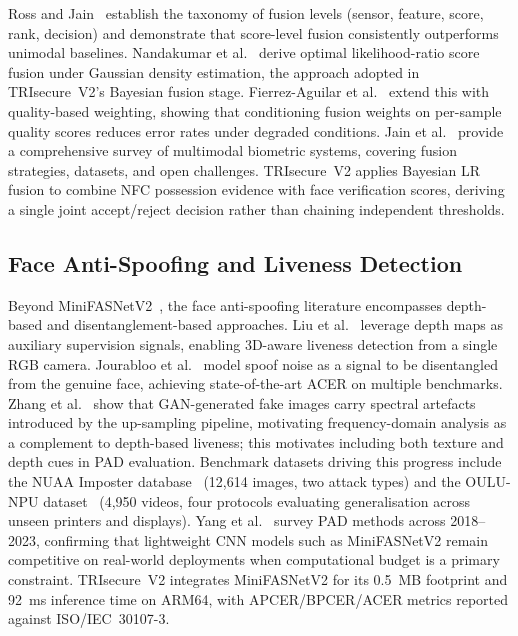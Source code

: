 \documentclass[preprint,12pt]{elsarticle}
\begin{document}
Ross and Jain~\cite{ross2003multimodal} establish the taxonomy of fusion
levels (sensor, feature, score, rank, decision) and demonstrate that
score-level fusion consistently outperforms unimodal baselines.
Nandakumar et al.~\cite{nandakumar2008fusion} derive optimal likelihood-ratio
score fusion under Gaussian density estimation, the approach adopted in
TRIsecure~V2's Bayesian fusion stage.
Fierrez-Aguilar et al.~\cite{fierrez2005fusion} extend this with quality-based
weighting, showing that conditioning fusion weights on per-sample quality
scores reduces error rates under degraded conditions.
Jain et al.~\cite{jain2011multimodal} provide a comprehensive survey of
multimodal biometric systems, covering fusion strategies, datasets, and
open challenges.
TRIsecure~V2 applies Bayesian LR fusion to combine NFC possession evidence
with face verification scores, deriving a single joint accept/reject decision
rather than chaining independent thresholds.

\subsection{Face Anti-Spoofing and Liveness Detection}

Beyond MiniFASNetV2~\cite{zhang2020minifasnet}, the face anti-spoofing
literature encompasses depth-based and disentanglement-based approaches.
Liu et al.~\cite{liu2018learning} leverage depth maps as auxiliary supervision
signals, enabling 3D-aware liveness detection from a single RGB camera.
Jourabloo et al.~\cite{jourabloo2018desp} model spoof noise as a signal to be
disentangled from the genuine face, achieving state-of-the-art ACER on
multiple benchmarks.
Zhang et al.~\cite{zhang2019autoGAN} show that GAN-generated fake images
carry spectral artefacts introduced by the up-sampling pipeline, motivating
frequency-domain analysis as a complement to depth-based liveness; this
motivates including both texture and depth cues in PAD evaluation.
Benchmark datasets driving this progress include the NUAA Imposter
database~\cite{tan2010nuaa} (12,614 images, two attack types) and the
OULU-NPU dataset~\cite{boulkenafet2017oulu} (4,950 videos, four protocols
evaluating generalisation across unseen printers and displays).
Yang et al.~\cite{yang2023pad_survey} survey PAD methods across 2018–2023,
confirming that lightweight CNN models such as MiniFASNetV2 remain
competitive on real-world deployments when computational budget is a
primary constraint.
TRIsecure~V2 integrates MiniFASNetV2 for its 0.5~MB footprint and 92~ms
inference time on ARM64, with APCER/BPCER/ACER metrics reported against
ISO/IEC~30107-3.
\end{document}
